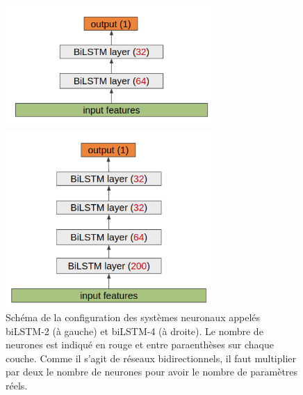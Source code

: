 \begin{figure}[thb]
  \centering
  \begin{minipage}[b]{0.49\linewidth}
      \center
      \centerline{\includegraphics[width=8cm]{./Chapitre5/figures/biLSTM2.png}}
  \end{minipage}
  \begin{minipage}[b]{0.49\linewidth}
      \center
      \centerline{\includegraphics[width=8cm]{./Chapitre5/figures/biLSTM4.png}}
  \end{minipage}
    \caption{Schéma de la configuration des systèmes neuronaux appelés biLSTM-2 (à gauche) et biLSTM-4 (à droite). Le nombre de neurones est indiqué en rouge et entre paraenthèses sur chaque couche. Comme il s'agit de réseaux bidirectionnels, il faut multiplier par deux le nombre de neurones pour avoir le nombre de paramètres réels.}
    \label{fig:biLSTM}
\end{figure}
